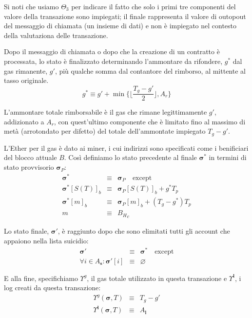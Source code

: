 \documentclass[9pt,oneside]{amsart}
\begin{document}
\begin{multicols}{2}
Si noti che usiamo $\Theta_{3}$ per indicare il fatto che solo i primi tre componenti del valore della transazione sono impiegati; il finale rappresenta il valore di outopout del messaggio di chiamata (un insieme di dati) e non è impiegato nel contesto della valutaziona delle transazione.

Dopo il messaggio di chiamata o dopo che la creazione di un contratto è processata, lo stato è finalizzato determinando l'ammontare da rifondere, $g^*$ dal gas rimanente, $g'$, più qualche somma dal contantore del rimborso, al mittente al tasso originale.
\begin{equation}
g^* \equiv g' + \min \{ \Big\lfloor \dfrac{T_g - g'}{2} \Big\rfloor, A_r \}
\end{equation}

L'ammontare totale rimborsabile è il gas che rimane legittimamente $g'$, addizionato a $A_r$, con quest'ultimo componente che è limitato fino al massimo di metà (arrotondato per difetto) del totale dell'ammontate impiegato $T_g - g'$.

L'Ether per il gas è dato ai miner, i cui indirizzi sono specificati come i benificiari del blocco attuale $B$. Così definiamo lo stato precedente al finale $\boldsymbol{\sigma}^*$ in termini di stato provvisorio $\boldsymbol{\sigma}_P$:
\begin{eqnarray}
\boldsymbol{\sigma}^* & \equiv & \boldsymbol{\sigma}_P \quad \text{except} \\
\boldsymbol{\sigma}^*[S(T)]_b & \equiv & \boldsymbol{\sigma}_P[S(T)]_b + g^* T_p \\
\boldsymbol{\sigma}^*[m]_b & \equiv & \boldsymbol{\sigma}_P[m]_b + (T_g - g^*) T_p \\
m & \equiv & {B_H}_c
\end{eqnarray}

Lo stato finale, $\boldsymbol{\sigma}'$, è raggiunto dopo che sono elimitati tutti gli account che appaiono nella lista suicidio:
\begin{eqnarray}
\boldsymbol{\sigma}' & \equiv & \boldsymbol{\sigma}^* \quad \text{except} \\
\forall i \in A_\mathbf{s}: \boldsymbol{\sigma}'[i] & \equiv & \varnothing
\end{eqnarray}

E alla fine, specifichiamo $\Upsilon^g$, il gas totale utilizzato in questa transazione e $\Upsilon^\mathbf{l}$, i log creati da questa transazione:
\begin{eqnarray}
\Upsilon^g(\boldsymbol{\sigma}, T) & \equiv & T_g - g' \\
\Upsilon^\mathbf{l}(\boldsymbol{\sigma}, T) & \equiv & A_\mathbf{l}
\end{eqnarray}


\end{multicols}
\end{document}

